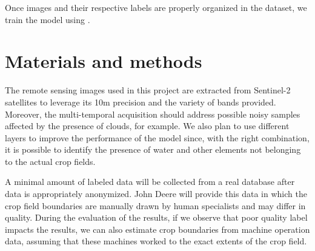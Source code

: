 \documentclass[12pt]{article}
\begin{document}
Once images and their respective labels are properly organized in the dataset, we train the model using .


\section{Materials and methods}\label{section:materiais}

The remote sensing images used in this project are extracted from Sentinel-2 satellites to leverage its 10m precision and the variety of bands provided. Moreover, the multi-temporal acquisition should address possible noisy samples affected by the presence of clouds, for example. We also plan to use different layers to improve the performance of the model since, with the right combination, it is possible to identify the presence of water and other elements not belonging to the actual crop fields.

A minimal amount of labeled data will be collected from a real database after data is appropriately anonymized. John Deere will provide this data in which the crop field boundaries are manually drawn by human specialists and may differ in quality. During the evaluation of the results, if we observe that poor quality label impacts the results, we can also estimate crop boundaries from machine operation data, assuming that these machines worked to the exact extents of the crop field.
\end{document}
